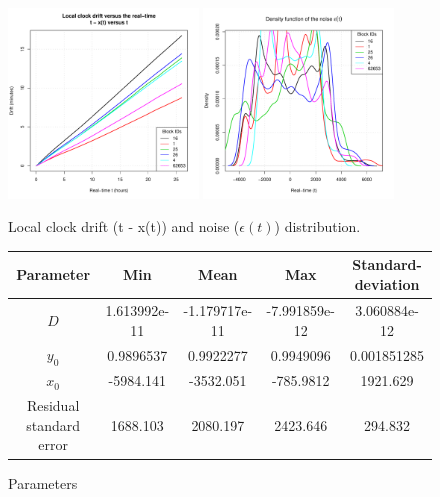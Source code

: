 \documentclass[11pt]{article}
\begin{document}
\begin{figure}[h!]
\centering
\includegraphics[width=0.45\textwidth]{pictures/drift.pdf}
\includegraphics[width=0.45\textwidth]{pictures/noise.pdf}
\caption{Local clock drift (t - x(t)) and noise ($\epsilon(t)$) distribution.}
\label{fig:drift-noise}
\end{figure}

\begin{figure}[h!]
\footnotesize
\begin{center}
\begin{tabular}{|c|c|c|c|c|} 
\hline
Parameter & Min & Mean & Max & Standard-deviation \\
\hline
$D$ & 1.613992e-11 & -1.179717e-11 & -7.991859e-12 & 3.060884e-12 \\
\hline
$y_0$ & 0.9896537 & 0.9922277 & 0.9949096 & 0.001851285\\
\hline
$x_0$ & -5984.141 & -3532.051 & -785.9812 & 1921.629\\
\hline
Residual standard error & 1688.103 &  2080.197  & 2423.646 & 294.832\\
\hline
\end{tabular}
\end{center}
\caption{Parameters}
\end{figure}
\end{document}
